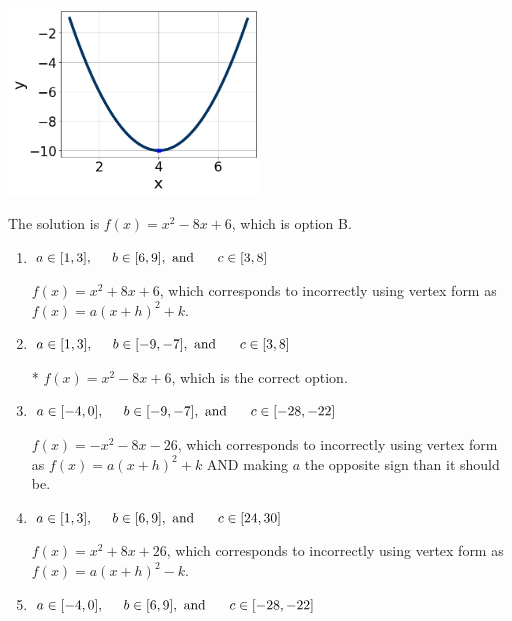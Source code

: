 \documentclass{extbook}[14pt]
\begin{document}
\begin{enumerate}
{\begin{center}
    \includegraphics[width=0.5\textwidth]{../Figures/quadraticGraphToEquationCopyC.png}
\end{center}



The solution is \( f(x) = x^{2} -8 x + 6 \), which is option B.\begin{enumerate}[label=\Alph*.]
\item \( a \in [1, 3], \hspace*{5mm} b \in [6, 9], \text{ and } \hspace*{5mm} c \in [3, 8] \)

$f(x)=x^{2} +8 x + 6$, which corresponds to incorrectly using vertex form as $f(x) = a(x+h)^2+k$.
\item \( a \in [1, 3], \hspace*{5mm} b \in [-9, -7], \text{ and } \hspace*{5mm} c \in [3, 8] \)

* $f(x)=x^{2} -8 x + 6$, which is the correct option.
\item \( a \in [-4, 0], \hspace*{5mm} b \in [-9, -7], \text{ and } \hspace*{5mm} c \in [-28, -22] \)

$f(x)=-x^{2} -8 x -26$, which corresponds to incorrectly using vertex form as $f(x) = a(x+h)^2+k$ AND making $a$ the opposite sign than it should be.
\item \( a \in [1, 3], \hspace*{5mm} b \in [6, 9], \text{ and } \hspace*{5mm} c \in [24, 30] \)

$f(x)=x^{2} +8 x + 26$, which corresponds to incorrectly using vertex form as $f(x) = a(x+h)^2 - k$.
\item \( a \in [-4, 0], \hspace*{5mm} b \in [6, 9], \text{ and } \hspace*{5mm} c \in [-28, -22] \)


\end{enumerate}}
\end{enumerate}
\end{document}
